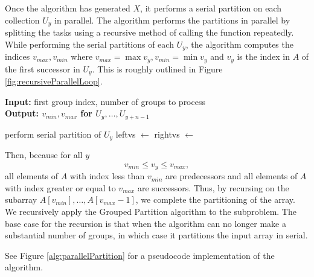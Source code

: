 \documentclass[twocolumn, twoside, 11pt]{article}
\begin{document}
Once the algorithm has generated $X$, it performs a serial partition on each collection $U_y$ in parallel. 
The algorithm performs the partitions in parallel by splitting the tasks using a recursive method of calling the function repeatedly.
While performing the serial partitions of each $U_y$, the algorithm computes the indices $v_{max}, v_{min}$ where $v_{max}=\max{v_y}, v_{min}=\min v_y$ and $v_y$ is the index in $A$ of the first successor in $U_y$.
This is roughly outlined in Figure \ref{fig:recursiveParallelLoop}.
\begin{figure*}
	\caption{Recursive Spawning Implementation of Parallel For Loop}
	\label{fig:recursiveParallelLoop}
	\textbf{Input:} first group index, number of groups to process\\
	\textbf{Output: $v_{min}, v_{max}$ for $U_y,\ldots, U_{y+n-1}$}
	\begin{algorithmic}[1]
				\State perform serial partition of $U_y$
				\State{}
			\Else
				\State leftvs $\gets$ 
				\State rightvs $\gets$ 
				\State{}
			\EndIf
		\EndProcedure
	\end{algorithmic}	
\end{figure*}

Then, because for all $y$ 
$$v_{min}\leq v_{y} \leq v_{max},$$
all elements of $A$ with index less than $v_{min}$ are predecessors and all elements of $A$ with index greater or equal to $v_{max}$ are successors.
Thus, by recursing on the subarray $A[v_{min}],\ldots,A[v_{max}-1]$, we complete the partitioning of the array.
We recursively apply the Grouped Partition algorithm to the subproblem.
The base case for the recursion is that when the algorithm can no longer make a substantial number of groups, in which case it partitions the input array in serial.

See Figure \ref{alg:parallelPartition} for a pseudocode implementation of the algorithm.
\end{document}
